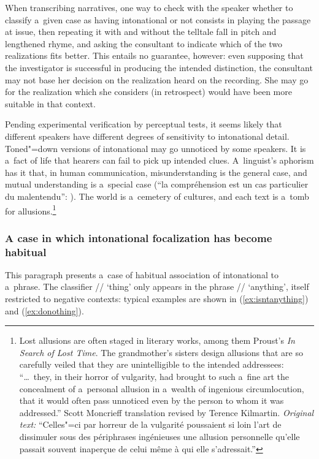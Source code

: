 When transcribing narratives, one way to check with the speaker whether to classify a~given case as having intonational  or not consists in playing the passage at issue, then repeating it with and without the telltale fall in pitch and lengthened rhyme, and asking the consultant to indicate which of the two realizations fits better. This entails no guarantee, however: even supposing that the investigator is successful in producing the intended distinction, the consultant may not base her decision on the realization heard on the recording. She may go for the realization which she considers (in retrospect) would have been more suitable in that context. 

Pending experimental verification by perceptual tests, it seems likely that different speakers have different degrees of sensitivity to intonational detail. Toned"=down versions of intonational  may go unnoticed by some speakers. It is a~fact of life that hearers can fail to pick up intended clues. A~linguist's aphorism has it that, in human communication, misunderstanding is the general case, and mutual understanding is a~special case (``la compréhension est un cas parti\-culier du malentendu'': \citealt[39]{culioli1990}). The world is a~cemetery of cultures, and each text is a~tomb for allusions.\footnote{Lost allusions are often staged in literary works, among them Proust's \textit{In Search of Lost Time}. The grandmother's sisters design allusions that are so carefully veiled that they are unintelligible to the intended addressees: ``{\dots}~they, in their horror of vulgarity, had brought to such a~fine art the concealment of a~personal allusion in a~wealth of ingenious circumlocution, that it would often pass unnoticed even by the person to whom it was addressed.'' Scott Moncrieff translation revised by Terence Kilmartin. \textit{Original text:} ``Celles"=ci par horreur de la vulgarité poussaient si loin l’art de dissimuler sous des périphrases ingénieuses une allusion personnelle qu’elle passait souvent inaperçue de celui même à qui elle s’adressait.''} 

\subsubsection{A case in which intonational focalization has become habitual}
\label{sec:acaseofhabitualassociationofintonationalfocalizationtoaphraseillustratingtheaffinitiesbetweenfocalizationandnegation}

This paragraph presents a~case of habitual association of intonational  to a~phrase. The classifier // ‘thing’ only appears in the phrase // ‘anything’, itself
restricted to negative contexts: typical examples are shown in (\ref{ex:isntanything}) and (\ref{ex:donothing}).

